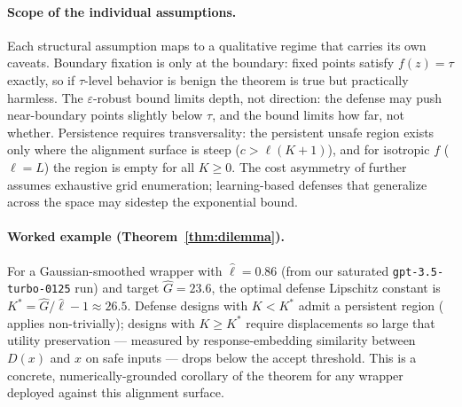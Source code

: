 \documentclass[11pt]{article}
\begin{document}
\paragraph{Scope of the individual assumptions.}
Each structural assumption maps to a qualitative regime that carries
its own caveats. Boundary fixation is only at the boundary: fixed
points satisfy $f(z) = \tau$ exactly, so if $\tau$-level behavior is
benign the theorem is true but practically harmless. The
$\varepsilon$-robust bound limits depth, not direction: the defense
may push near-boundary points slightly below $\tau$, and the bound
limits how far, not whether. Persistence requires transversality: the
persistent unsafe region exists only where the alignment surface is
steep ($c > \ell(K{+}1)$), and for isotropic $f$ ($\ell = L$) the
region is empty for all $K \geq 0$. The cost asymmetry of
 further assumes exhaustive grid enumeration;
learning-based defenses that generalize across the space may sidestep
the exponential bound.

\paragraph{Worked example (Theorem~\ref{thm:dilemma}).}
For a Gaussian-smoothed wrapper with $\hat\ell = 0.86$ (from our
saturated \texttt{gpt-3.5-turbo-0125} run) and target
$\hat G = 23.6$, the optimal defense Lipschitz constant is
$K^* = \hat G / \hat\ell - 1 \approx 26.5$. Defense designs with
$K < K^*$ admit a persistent region ( applies
non-trivially); designs with $K \geq K^*$ require displacements so
large that utility preservation --- measured by response-embedding
similarity between $D(x)$ and $x$ on safe inputs --- drops below the
accept threshold. This is a concrete, numerically-grounded corollary
of the theorem for any wrapper deployed against this alignment
surface.
\end{document}
